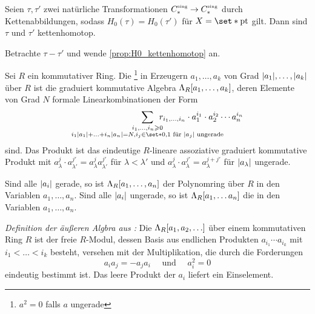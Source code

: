 \begin{korollar}[label=korr:H0_kettenhomotop,{name=[Kettenhomotopie von natürlichen Transformationen]}]
	Seien $\tau, \tau'$ zwei natürliche Transformationen $C_*^\sing \to C_*^\sing$ durch Kettenabbildungen, sodass $H_0(\tau) = H_0(\tau')$ für $X= \set*{\pt}$ gilt. 
	Dann sind $\tau$ und $\tau'$ kettenhomotop.
\end{korollar}
\begin{beweis}
	Betrachte $\tau-\tau'$ und wende \autoref{prop:H0_kettenhomotop} an.
\end{beweis}

\begin{definition}[{name=[Äußere Algebra]}]
	Sei $R$ ein kommutativer Ring. Die \footnote{$a^2=0$ falls $a$ ungerade} in Erzeugern $a_1, \ldots, a_k$ von Grad $\abs*{a_1}, \ldots , \abs*{a_k}$ über $R$ ist die 
	graduiert kommutative Algebra $\Lambda_R \benbrace*{a_1,\ldots,a_k}$, deren Elemente von Grad $N$ formale Linearkombinationen der Form 
	\[
		\smashoperator[r]{\sum_{\substack{i_1, \ldots ,i_n \ge 0 \\ i_1 \abs*{a_1} + \ldots + i_n \abs*{a_n} = N , i_j \in \set*{0,1} \text{ für } \abs*{a_j} \text{ ungerade}}}} 
		\enspace r_{i_1, \ldots ,i_n} \cdot a_1^{i_1} \cdot a_2^{i_2} \cdots a_n^{i_n}
	\]
	sind.
	Das Produkt ist das eindeutige $R$-lineare assoziative graduiert kommutative Produkt mit $a_\lambda^j \cdot a_{\lambda'}^{j'} = a_\lambda^j a_{\lambda'}^{j'}$ für 
	$\lambda< \lambda'$ und $a_\lambda^j \cdot a_\lambda^{j'} = a_\lambda^{j+j'}$ für $\abs*{a_\lambda}$ ungerade.
\end{definition}

\begin{beispiel}[{name=[Polynomring und äußere Algebra]}]
	Sind alle $\abs*{a_i}$ gerade, so ist $\Lambda_R \benbrace*{a_1,\ldots,a_n}$ der Polynomring über $R$ in den Variablen $a_1, \ldots ,a_n$.
	Sind alle $\abs*{a_i}$ ungerade, so ist $\Lambda_R \benbrace*{a_1, \ldots a_n}$ die  in den Variablen $a_1, \ldots , a_n$.
	
	\emph{Definition der äußeren Algbra aus \cite[Ex. 3.15]{Hatcher}:}
	Die  $\Lambda_R \benbrace*{a_1,a_2,\ldots }$ über einem kommutativen Ring $R$ ist der freie $R$-Modul, dessen Basis aus endlichen Produkten $a_{i_1} \cdots a_{i_k}$ mit $i_1 < \ldots < i_k$ besteht, versehen mit der Multiplikation, die durch die Forderungen 
	\[
		a_i a_j= -a_j a_i \quad \text{ und } \quad  a_i^2=0
	\]
	eindeutig bestimmt ist. 
	Das leere Produkt der $a_i$ liefert ein Einselement.
\end{beispiel}

